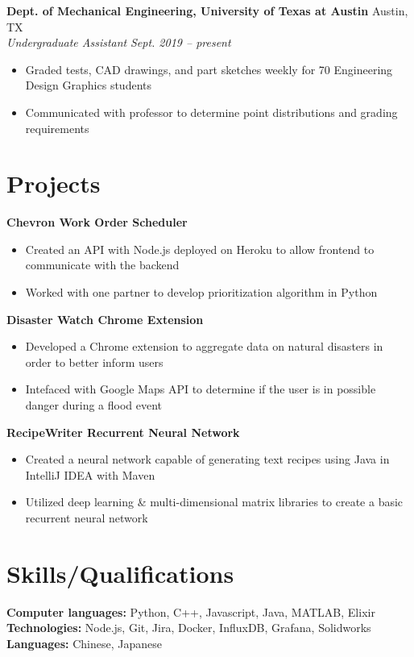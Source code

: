 \documentclass[letterpaper,11pt]{article}
\begin{document}
\textbf{Dept. of Mechanical Engineering, University of Texas at Austin} \hfill Austin, TX\\
\textit{Undergraduate Assistant} \hfill \textit{Sept. 2019 -- present}\\
\begin{itemize}[noitemsep, topsep=0pt, leftmargin=0.7cm]
  \item Graded tests, CAD drawings, and part sketches weekly for 70 Engineering Design Graphics students
  \item Communicated with professor to determine point distributions and grading requirements
\end{itemize}

\section{Projects}
\textbf{Chevron Work Order Scheduler}\\
\begin{itemize}[noitemsep, topsep=0pt, leftmargin=0.7cm]
  \item Created an API with Node.js deployed on Heroku to allow frontend to communicate with the backend
  \item Worked with one partner to develop prioritization algorithm in Python
\end{itemize}
\textbf{Disaster Watch Chrome Extension}\\
\begin{itemize}[noitemsep, topsep=0pt, leftmargin=0.7cm]
  \item Developed a Chrome extension to aggregate data on natural disasters in order to better inform users
  \item Intefaced with Google Maps API to determine if the user is in possible danger during a flood event
\end{itemize}
\textbf{RecipeWriter Recurrent Neural Network}\\
\begin{itemize}[noitemsep, topsep=0pt, leftmargin=0.7cm]
  \item Created a neural network capable of generating text recipes using Java in IntelliJ IDEA with Maven
  \item Utilized deep learning \& multi-dimensional matrix libraries to create a basic recurrent neural network
\end{itemize}

\section{Skills/Qualifications}
\textbf{Computer languages:} Python, C++, Javascript, Java, MATLAB, Elixir\\
\textbf{Technologies:} Node.js, Git, Jira, Docker, InfluxDB, Grafana, Solidworks\\
\textbf{Languages:} Chinese, Japanese\\
\end{document}
